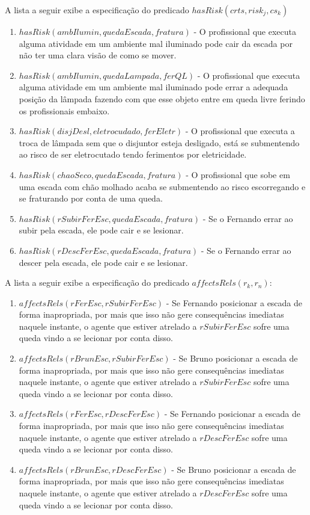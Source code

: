 A lista a seguir exibe a especificação do predicado $hasRisk(crts,risk_j,cs_k)$

\begin{enumerate}
	\item $hasRisk(ambIlumin,quedaEscada,fratura)$ - O profissional que executa alguma atividade em um ambiente mal iluminado pode cair da escada por não ter uma clara visão de como se mover. 
	\item $hasRisk(ambIlumin,quedaLampada,ferQL)$ - O profissional que executa alguma atividade em um ambiente mal iluminado pode errar a adequada posição da lâmpada fazendo com que esse objeto entre em queda livre ferindo os profissionais embaixo.
	\item $hasRisk(disjDesl, eletrocudado, ferEletr)$ - O profissional que executa a troca de lâmpada sem que o disjuntor esteja desligado, está se submentendo ao risco de ser eletrocutado tendo ferimentos por eletricidade.
	\item $hasRisk(chaoSeco,quedaEscada,fratura)$ - O profissional que sobe em uma escada com chão molhado acaba se submentendo ao risco escorregando e se fraturando por conta de uma queda.
	\item $hasRisk(rSubirFerEsc,quedaEscada,fratura)$ - Se o Fernando errar ao subir pela escada, ele pode cair e se lesionar. 
	\item $hasRisk(rDescFerEsc,quedaEscada,fratura)$ - Se o Fernando errar ao descer pela escada, ele pode cair e se lesionar. 		
\end{enumerate}

A lista a seguir exibe a especificação do predicado $affectsRels(r_k,r_n)$:

\begin{enumerate}
	\item $affectsRels(rFerEsc,rSubirFerEsc)$ - Se Fernando posicionar a escada de forma inapropriada, por mais que isso não gere consequências imediatas naquele instante, o agente que estiver atrelado a $rSubirFerEsc$ sofre uma queda vindo a se lecionar por conta disso. 
	\item $affectsRels(rBrunEsc,rSubirFerEsc)$ - Se Bruno posicionar a escada de forma inapropriada, por mais que isso não gere consequências imediatas naquele instante, o agente que estiver atrelado a $rSubirFerEsc$ sofre uma queda vindo a se lecionar por conta disso. 
	\item $affectsRels(rFerEsc,rDescFerEsc)$ - Se Fernando posicionar a escada de forma inapropriada, por mais que isso não gere consequências imediatas naquele instante, o agente que estiver atrelado a $rDescFerEsc$ sofre uma queda vindo a se lecionar por conta disso. 
	\item $affectsRels(rBrunEsc,rDescFerEsc)$ - Se Bruno posicionar a escada de forma inapropriada, por mais que isso não gere consequências imediatas naquele instante, o agente que estiver atrelado a $rDescFerEsc$ sofre uma queda vindo a se lecionar por conta disso. 
\end{enumerate}

